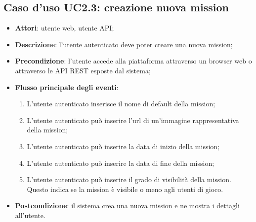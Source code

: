 \subsection{Caso d'uso UC2.3: creazione nuova mission}
\begin{itemize}
\item \textbf{Attori}: utente web, utente API;
\item \textbf{Descrizione}: l'utente autenticato deve poter creare una nuova mission; 
      \item \textbf{Precondizione}: l'utente accede alla piattaforma attraverso un browser web o attraverso le API REST esposte dal sistema;

        \item \textbf{Flusso principale degli eventi}:
          \begin{enumerate}
          \item L'utente autenticato inserisce il nome di default della mission;
          \item L'utente autenticato può inserire l'\gls{url}\glsfirstoccur{} di un'immagine rappresentativa della mission;
          \item L'utente autenticato può inserire la data di inizio della mission;
          \item L'utente autenticato può inserire la data di fine della mission;
          \item L'utente autenticato può inserire il grado di visibilità della mission. Questo indica se la mission è visibile o meno agli utenti di gioco.

      \end{enumerate}
    \item \textbf{Postcondizione}: il sistema crea una nuova mission e ne mostra i dettagli all'utente.
  \end{itemize}
\hypertarget{UC2.4}{}
